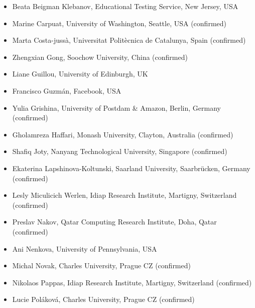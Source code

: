 \documentclass[11pt]{article}
\begin{document}
\begin{itemize} \setlength{\itemsep}{0pt}
\item Beata Beigman Klebanov, Educational Testing Service, New Jersey, USA
\item Marine Carpuat, University of Washington, Seattle, USA (confirmed)
\item Marta Costa-jussà, Universitat Politècnica de Catalunya, Spain (confirmed)
\item Zhengxian Gong, Soochow University, China (confirmed)
\item Liane Guillou, University of Edinburgh, UK
\item Francisco Guzm\'{a}n, Facebook, USA
\item Yulia Grishina, University of Postdam \& Amazon, Berlin, Germany (confirmed)
\item Gholamreza Haffari, Monash University, Clayton, Australia (confirmed) %
\item Shafiq Joty, Nanyang Technological University, Singapore (confirmed)
\item Ekaterina Lapshinova-Koltunski, Saarland University, Saarbrücken, Germany (confirmed)
\item Lesly Miculicich Werlen, Idiap Research Institute, Martigny, Switzerland (confirmed)
\item Preslav Nakov, Qatar Computing Research Institute, Doha, Qatar (confirmed)
\item Ani Nenkova, University of Pennsylvania, USA
\item Michal Novak, Charles University, Prague CZ (confirmed) %
\item Nikolaos Pappas, Idiap Research Institute, Martigny, Switzerland (confirmed)
\item Lucie Pol\'{a}kov\'{a}, Charles University, Prague CZ (confirmed)%

\end{itemize}
\end{document}
